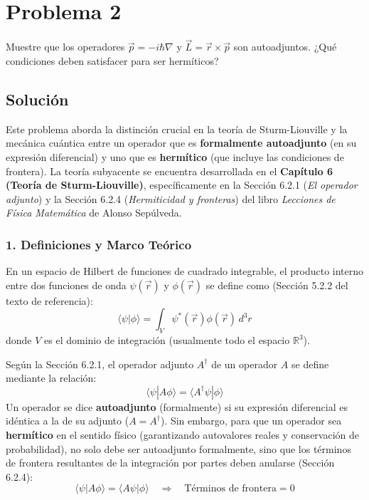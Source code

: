 \documentclass[a4paper]{article}
\begin{document}
\section{Problema 2}
Muestre que los operadores $\vec{p} = -i\hbar\nabla$ y $\vec{L} = \vec{r} \times \vec{p}$ son autoadjuntos. ¿Qué condiciones deben satisfacer para ser hermíticos?

\subsection{Solución}

Este problema aborda la distinción crucial en la teoría de Sturm-Liouville y la mecánica cuántica entre un operador que es \textbf{formalmente autoadjunto} (en su expresión diferencial) y uno que es \textbf{hermítico} (que incluye las condiciones de frontera). La teoría subyacente se encuentra desarrollada en el \textbf{Capítulo 6 (Teoría de Sturm-Liouville)}, específicamente en la Sección 6.2.1 (\textit{El operador adjunto}) y la Sección 6.2.4 (\textit{Hermiticidad y fronteras}) del libro \textit{Lecciones de Física Matemática} de Alonso Sepúlveda.

\subsubsection{1. Definiciones y Marco Teórico}

En un espacio de Hilbert de funciones de cuadrado integrable, el producto interno entre dos funciones de onda $\psi(\vec{r})$ y $\phi(\vec{r})$ se define como (Sección 5.2.2 del texto de referencia):
$$
\langle \psi | \phi \rangle = \int_V \psi^*(\vec{r}) \phi(\vec{r}) \, d^3r
$$
donde $V$ es el dominio de integración (usualmente todo el espacio $\mathbb{R}^3$).

Según la Sección 6.2.1, el operador adjunto $A^\dagger$ de un operador $A$ se define mediante la relación:
$$
\langle \psi | A \phi \rangle = \langle A^\dagger \psi | \phi \rangle
$$
Un operador se dice \textbf{autoadjunto} (formalmente) si su expresión diferencial es idéntica a la de su adjunto ($A = A^\dagger$). Sin embargo, para que un operador sea \textbf{hermítico} en el sentido físico (garantizando autovalores reales y conservación de probabilidad), no solo debe ser autoadjunto formalmente, sino que los términos de frontera resultantes de la integración por partes deben anularse (Sección 6.2.4):
$$
\langle \psi | A \phi \rangle = \langle A \psi | \phi \rangle \quad \Rightarrow \quad \text{Términos de frontera} = 0
$$
\end{document}

